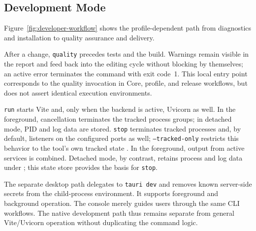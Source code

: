 \subsection{Development Mode}
\label{subsec:entwicklungsbetrieb}

Figure~\ref{fig:developer-workflow} shows the profile-dependent path from
diagnostics and installation to quality assurance and delivery.



After a change, \texttt{quality} precedes tests and the build. Warnings remain
visible in the report and feed back into the editing cycle without blocking by
themselves; an active error terminates the command with exit code~1. This local
entry point corresponds to the quality invocation in Core, profile, and
release workflows, but does not assert identical execution environments.

\texttt{run} starts Vite and, only when the backend is active, Uvicorn as
well. In the foreground, cancellation terminates the tracked process groups;
in detached mode, PID and log data are stored. \texttt{stop} terminates
tracked processes and, by default, listeners on the configured ports as well;
\texttt{--tracked-only} restricts this behavior to the tool's own tracked state
\parencite{kleiveist2026control,kleiveist2026tooling}.
In the foreground, output from active services is combined. Detached mode, by
contrast, retains process and log data under ; this state
store provides the basis for \texttt{stop}.

The separate desktop path delegates to \texttt{tauri dev} and removes known
server-side secrets from the child-process environment. It supports foreground
and background operation. The console merely guides users through the same CLI
workflows.
The native development path thus remains separate from general Vite/Uvicorn
operation without duplicating the command logic.
